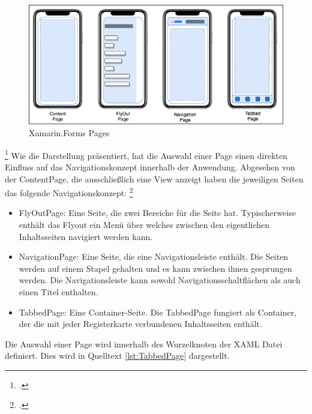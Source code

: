 \begin{figure}[h]
 \includegraphics[width=\textwidth,height=\textheight,keepaspectratio]{Images/CrossPlattformFrameworks/XamarinFormsPages.png}
 \caption[Xamarin.Forms Pages]{Xamarin.Forms Pages\footnotemark}
 \label{fig:Xamarin.Forms Pages}
\end{figure}
\footcitetext[Abbildung in Anlehnung an ][Abgerufen am \today]{MicrosoftXamPages2016}
Wie die Darstellung präsentiert, hat die Auswahl einer Page einen direkten Einfluss auf das Navigationskonzept innerhalb der Anwendung.  Abgesehen von der ContentPage, die ausschließlich eine View anzeigt haben die jeweiligen Seiten das folgende Navigationskonzept: \footcite[Vgl.][Abgerufen am \today]{MicrosoftXamPages2016}

\begin{itemize}
\setlength\itemsep{-0.6em}
 \item FlyOutPage: Eine Seite, die zwei Bereiche für die Seite hat. Typischerweise enthält das Flyout ein Menü über welches zwischen den eigentlichen Inhaltsseiten navigiert werden kann.
 \item NavigationPage: Eine Seite,  die eine Navigationsleiste enthält.  Die Seiten werden auf einem Stapel gehalten und es kann zwischen ihnen gesprungen werden.  Die Navigationsleiste kann sowohl Navigationsschaltflächen als auch einen Titel enthalten.
 \item TabbedPage: Eine Container-Seite.  Die TabbedPage fungiert als Container,  der die mit jeder Registerkarte verbundenen Inhaltsseiten enthält.
\end{itemize}

Die Auswahl einer Page wird innerhalb des Wurzelknoten der XAML Datei definiert.  Dies wird in Quelltext \ref{lst:TabbedPage} dargestellt. 

\begin{minipage}{\linewidth}

\end{minipage}


